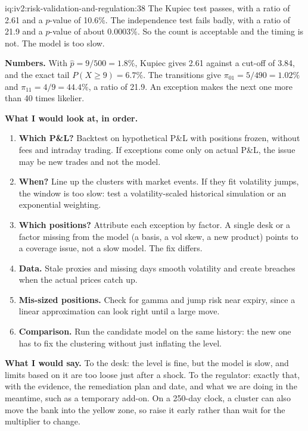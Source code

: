 \begin{solution}{iq:iv2:risk-validation-and-regulation:38}
The Kupiec test passes, with a ratio of 2.61 and a $p$-value of 10.6\%. The independence test fails badly, with a ratio of 21.9 and a $p$-value of about 0.0003\%. So the count is acceptable and the timing is not. The model is too slow.

\textbf{Numbers.} With $\hat p = 9/500 = 1.8\%$, Kupiec gives 2.61 against a cut-off of 3.84, and the exact tail $P(X \ge 9) = 6.7\%$. The transitions give $\pi_{01} = 5/490 = 1.02\%$ and $\pi_{11} = 4/9 = 44.4\%$, a ratio of 21.9. An exception makes the next one more than 40 times likelier.

\textbf{What I would look at, in order.}
\begin{enumerate}
\item \textbf{Which P\&L?} Backtest on hypothetical P\&L with positions frozen, without fees and intraday trading. If exceptions come only on actual P\&L, the issue may be new trades and not the model.
\item \textbf{When?} Line up the clusters with market events. If they fit volatility jumps, the window is too slow: test a volatility-scaled historical simulation or an exponential weighting.
\item \textbf{Which positions?} Attribute each exception by factor. A single desk or a factor missing from the model (a basis, a vol skew, a new product) points to a coverage issue, not a slow model. The fix differs.
\item \textbf{Data.} Stale proxies and missing days smooth volatility and create breaches when the actual prices catch up.
\item \textbf{Mis-sized positions.} Check for gamma and jump risk near expiry, since a linear approximation can look right until a large move.
\item \textbf{Comparison.} Run the candidate model on the same history: the new one has to fix the clustering without just inflating the level.
\end{enumerate}

\textbf{What I would say.} To the desk: the level is fine, but the model is slow, and limits based on it are too loose just after a shock. To the regulator: exactly that, with the evidence, the remediation plan and date, and what we are doing in the meantime, such as a temporary add-on. On a 250-day clock, a cluster can also move the bank into the yellow zone, so raise it early rather than wait for the multiplier to change.

\end{solution}

